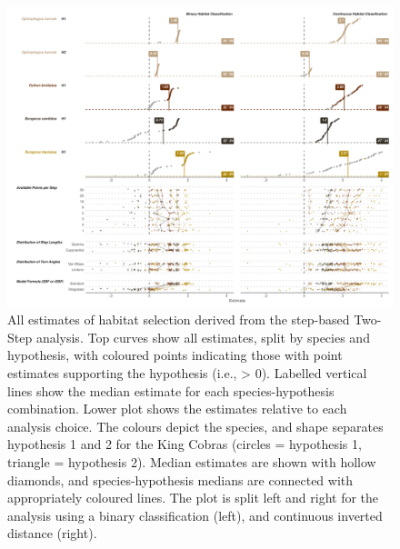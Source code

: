 \documentclass[10pt,a4paper]{article}
\begin{document}
\begin{figure}
\includegraphics[width=1\linewidth]{../../figures/specCurve_twoStep} \caption{All estimates of habitat selection derived from the step-based Two-Step analysis. Top curves show all estimates, split by species and hypothesis, with coloured points indicating those with point estimates supporting the hypothesis (i.e., > 0). Labelled vertical lines show the median estimate for each species-hypothesis combination. Lower plot shows the estimates relative to each analysis choice. The colours depict the species, and shape separates hypothesis 1 and 2 for the King Cobras (circles = hypothesis 1, triangle = hypothesis 2). Median estimates are shown with hollow diamonds, and species-hypothesis medians are connected with appropriately coloured lines. The plot is split left and right for the analysis using a binary classification (left), and continuous inverted distance (right).}\label{fig:specCurveTwoStep}
\end{figure}
\end{document}
